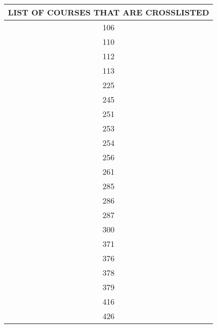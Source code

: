 
\begin{center}
\begin{tabular}{|c|}
\hline
LIST OF COURSES THAT ARE CROSSLISTED  \\ \hline
106                                        \\ \hline
110                                        \\ \hline
112                                      \\ \hline
113                                   \\ \hline
225                                       \\ \hline


245                                        \\ \hline
251                                        \\ \hline
253                                      \\ \hline
254                                   \\ \hline
256                                       \\ \hline



261                                        \\ \hline
285                                        \\ \hline
286                                      \\ \hline
287                                   \\ \hline
300                                       \\ \hline


371                                      \\ \hline
376                                        \\ \hline
378                                      \\ \hline
379                                   \\ \hline
416                                       \\ \hline
426 \\ \hline

\end{tabular}
\end{center}
